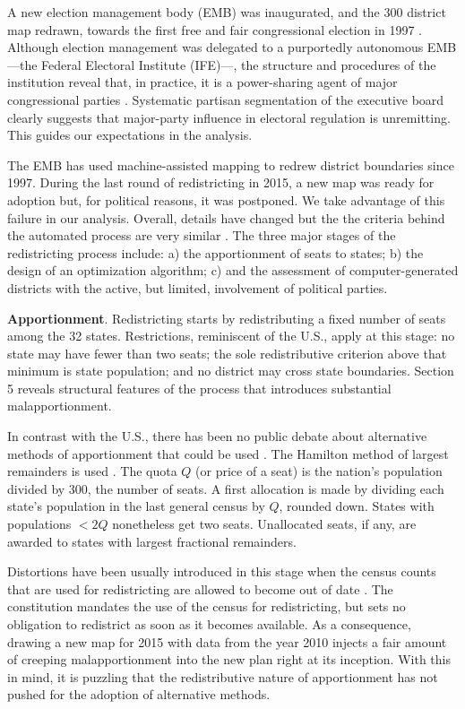 \documentclass[letter,12pt]{article}
\begin{document}
A new election management body (EMB) was inaugurated, and the 300 district map redrawn, towards the first free and fair congressional election in 1997 \citep{lujambio.vives.2008}. Although election management was delegated to a purportedly autonomous EMB ---the Federal Electoral Institute (IFE)---, the structure and procedures of the institution reveal that, in practice, it is a power-sharing agent of major congressional parties \citep{estevez.magar.rosas.2008}. Systematic partisan segmentation of the executive board clearly suggests that major-party influence in electoral regulation is unremitting. This guides our expectations in the analysis. 

The EMB has used machine-assisted mapping to redrew district boundaries since 1997. During the last round of redistricting in 2015, a new map was ready for adoption but, for political reasons, it was postponed. We take advantage of this failure in our analysis. Overall, details have changed but the the criteria behind the automated process are very similar \citep{trelles.mtz.tesisItam.2007}. The three major stages of the redistricting process include: a) the apportionment of seats to states; b) the design of an optimization algorithm; c) and the assessment of computer-generated districts with the active, but limited, involvement of political parties. 

\textbf{Apportionment}. Redistricting starts by redistributing a fixed number of seats among the 32 states. Restrictions, reminiscent of the U.S., apply at this stage: no state may have fewer than two seats; the sole redistributive criterion above that minimum is state population; and no district may cross state boundaries. Section 5 reveals structural features of the process that introduces substantial malapportionment. 

In contrast with the U.S., there has been no public debate about alternative methods of apportionment that could be used \citep{szpiro.numbersRule.2010,balinski.rodriguez.1996}. The Hamilton method of largest remainders is used \citep[][:10]{balinskiYoung2001FairRep}. The quota $Q$ (or price of a seat) is the nation's population divided by 300, the number of seats. A first allocation is made by dividing each state's population in the last general census by $Q$, rounded down. States with populations $<2Q$ nonetheless get two seats. Unallocated seats, if any, are awarded to states with largest fractional remainders. 

Distortions have been usually introduced in this stage when the census counts that are used for redistricting are allowed to become out of date \citep[also see][]{snyder.samuelsMalapp2004}. The constitution mandates the use of the census for redistricting, but sets no obligation to redistrict as soon as it becomes available. As a consequence, drawing a new map for 2015 with data from the year 2010 injects a fair amount of creeping malapportionment into the new plan right at its inception. With this in mind, it is puzzling that the redistributive nature of apportionment has not pushed for the adoption of alternative methods. 
\end{document}
